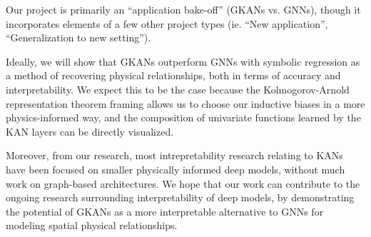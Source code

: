 \documentclass[11pt]{article}
\begin{document}
Our project is primarily an ``application bake-off'' (GKANs vs. GNNs), though it incorporates elements of a few other project types (ie. ``New application'', ``Generalization to new setting'').

Ideally, we will show that GKANs outperform GNNs with symbolic regression as a method of recovering physical relationships, both in terms of accuracy and interpretability. We expect this to be the case
because the Kolmogorov-Arnold representation theorem framing allows us to choose our inductive biases
in a more physics-informed way, and the composition of univariate functions learned by the KAN layers can be directly visualized.

Moreover, from our research, most intrepretability research relating to KANs have been focused on smaller physically informed deep models, without much work on graph-based architectures. We hope that our work can contribute to the ongoing research surrounding interpretability of deep models, by demonstrating the potential of GKANs as a more interpretable alternative to GNNs for modeling spatial physical relationships.





\end{document}
